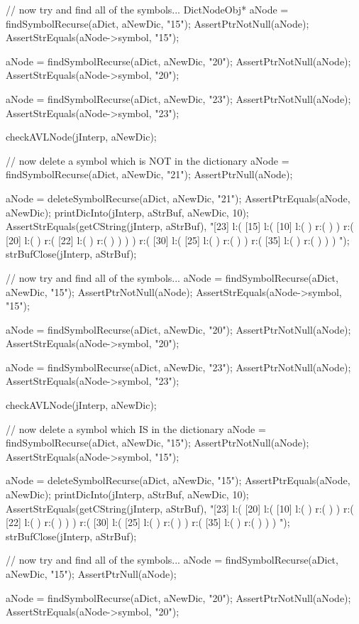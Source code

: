   // now try and find all of the symbols...
  DictNodeObj* aNode = findSymbolRecurse(aDict, aNewDic, "15");
  AssertPtrNotNull(aNode);
  AssertStrEquals(aNode->symbol, "15");

  aNode = findSymbolRecurse(aDict, aNewDic, "20");
  AssertPtrNotNull(aNode);
  AssertStrEquals(aNode->symbol, "20");

  aNode = findSymbolRecurse(aDict, aNewDic, "23");
  AssertPtrNotNull(aNode);
  AssertStrEquals(aNode->symbol, "23");

  checkAVLNode(jInterp, aNewDic);
  
  // now delete a symbol which is NOT in the dictionary
  aNode = findSymbolRecurse(aDict, aNewDic, "21");
  AssertPtrNull(aNode);
  
  aNode = deleteSymbolRecurse(aDict, aNewDic, "21");
  AssertPtrEquals(aNode, aNewDic);
  printDicInto(jInterp, aStrBuf, aNewDic, 10);
  AssertStrEquals(getCString(jInterp, aStrBuf),
  "[23] l:( [15] l:( [10] l:(  ) r:(  )  ) r:( [20] l:(  ) r:( [22] l:(  ) r:(  )  )  )  ) r:( [30] l:( [25] l:(  ) r:(  )  ) r:( [35] l:(  ) r:(  )  )  ) ");
  strBufClose(jInterp, aStrBuf);

  // now try and find all of the symbols...
  aNode = findSymbolRecurse(aDict, aNewDic, "15");
  AssertPtrNotNull(aNode);
  AssertStrEquals(aNode->symbol, "15");

  aNode = findSymbolRecurse(aDict, aNewDic, "20");
  AssertPtrNotNull(aNode);
  AssertStrEquals(aNode->symbol, "20");

  aNode = findSymbolRecurse(aDict, aNewDic, "23");
  AssertPtrNotNull(aNode);
  AssertStrEquals(aNode->symbol, "23");

  checkAVLNode(jInterp, aNewDic);

  // now delete a symbol which IS in the dictionary
  aNode = findSymbolRecurse(aDict, aNewDic, "15");
  AssertPtrNotNull(aNode);
  AssertStrEquals(aNode->symbol, "15");
  
  aNode = deleteSymbolRecurse(aDict, aNewDic, "15");
  AssertPtrEquals(aNode, aNewDic);
  printDicInto(jInterp, aStrBuf, aNewDic, 10);
  AssertStrEquals(getCString(jInterp, aStrBuf),
  "[23] l:( [20] l:( [10] l:(  ) r:(  )  ) r:( [22] l:(  ) r:(  )  )  ) r:( [30] l:( [25] l:(  ) r:(  )  ) r:( [35] l:(  ) r:(  )  )  ) ");
  strBufClose(jInterp, aStrBuf);

  // now try and find all of the symbols...
  aNode = findSymbolRecurse(aDict, aNewDic, "15");
  AssertPtrNull(aNode);

  aNode = findSymbolRecurse(aDict, aNewDic, "20");
  AssertPtrNotNull(aNode);
  AssertStrEquals(aNode->symbol, "20");

